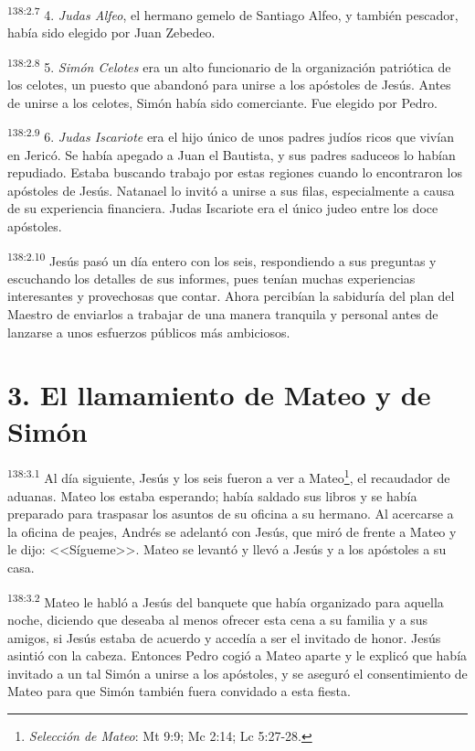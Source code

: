 \par 
\textsuperscript{138:2.7} 4. \textit{Judas Alfeo}, el hermano gemelo de Santiago Alfeo, y también pescador, había sido elegido por Juan Zebedeo.

\par 
\textsuperscript{138:2.8} 5. \textit{Simón Celotes} era un alto funcionario de la organización patriótica de los celotes, un puesto que abandonó para unirse a los apóstoles de Jesús. Antes de unirse a los celotes, Simón había sido comerciante. Fue elegido por Pedro.

\par 
\textsuperscript{138:2.9} 6. \textit{Judas Iscariote} era el hijo único de unos padres judíos ricos que vivían en Jericó. Se había apegado a Juan el Bautista, y sus padres saduceos lo habían repudiado. Estaba buscando trabajo por estas regiones cuando lo encontraron los apóstoles de Jesús. Natanael lo invitó a unirse a sus filas, especialmente a causa de su experiencia financiera. Judas Iscariote era el único judeo entre los doce apóstoles.

\par 
\textsuperscript{138:2.10} Jesús pasó un día entero con los seis, respondiendo a sus preguntas y escuchando los detalles de sus informes, pues tenían muchas experiencias interesantes y provechosas que contar. Ahora percibían la sabiduría del plan del Maestro de enviarlos a trabajar de una manera tranquila y personal antes de lanzarse a unos esfuerzos públicos más ambiciosos.

\section*{3. El llamamiento de Mateo y de Simón}
\par 
\textsuperscript{138:3.1} Al día siguiente, Jesús y los seis fueron a ver a Mateo\footnote{\textit{Selección de Mateo}: Mt 9:9; Mc 2:14; Lc 5:27-28.}, el recaudador de aduanas. Mateo los estaba esperando; había saldado sus libros y se había preparado para traspasar los asuntos de su oficina a su hermano. Al acercarse a la oficina de peajes, Andrés se adelantó con Jesús, que miró de frente a Mateo y le dijo: <<Sígueme>>. Mateo se levantó y llevó a Jesús y a los apóstoles a su casa.

\par 
\textsuperscript{138:3.2} Mateo le habló a Jesús del banquete que había organizado para aquella noche, diciendo que deseaba al menos ofrecer esta cena a su familia y a sus amigos, si Jesús estaba de acuerdo y accedía a ser el invitado de honor. Jesús asintió con la cabeza. Entonces Pedro cogió a Mateo aparte y le explicó que había invitado a un tal Simón a unirse a los apóstoles, y se aseguró el consentimiento de Mateo para que Simón también fuera convidado a esta fiesta.

